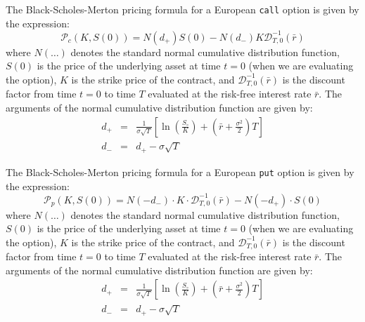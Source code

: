\documentclass[11pt]{article}
\theoremstyle{definition}
\begin{document}
\begin{definition}\label{defn:BSM-call-closed-form}
The Black-Scholes-Merton pricing formula for a European \texttt{call} option is given by the expression:
\begin{equation}
	\mathcal{P}_{c}(K,S(0)) = N(d_{+})S(0) - N(d_{-})K\mathcal{D}^{-1}_{T,0}(\bar{r})
\end{equation}
where $N(\dots)$ denotes the standard normal cumulative distribution function, $S(0)$ is the price of the underlying asset at time $t=0$ (when we are evaluating the option),
$K$ is the strike price of the contract, and $\mathcal{D}^{-1}_{T,0}(\bar{r})$ is the discount factor from time $t=0$ to time $T$ evaluated at the risk-free interest rate $\bar{r}$.
The arguments of the normal cumulative distribution function are given by:
\begin{eqnarray}
d_{+} & = & \frac{1}{\sigma\sqrt{T}}\left[\ln(\frac{S_{\circ}}{K}) + (\bar{r}+\frac{\sigma^{2}}{2})T\right] \\
d_{-} & = & d_{+} - \sigma\sqrt{T}
\end{eqnarray}
\end{definition}

\begin{definition}\label{defn:BSM-put-closed-form}
The Black-Scholes-Merton pricing formula for a European \texttt{put} option is given by the expression:
\begin{equation*}
\mathcal{P}_{p}(K,S(0)) = N(-d_{-})\cdot{K}\cdot\mathcal{D}^{-1}_{T,0}(\bar{r}) - N(-d_{+})\cdot{S}(0)
\end{equation*}
where $N(\dots)$ denotes the standard normal cumulative distribution function, 
$S(0)$ is the price of the underlying asset at time $t=0$ (when we are evaluating the option),
$K$ is the strike price of the contract, and $\mathcal{D}^{-1}_{T,0}(\bar{r})$ is the discount factor from time $t=0$ to time $T$ evaluated at the risk-free interest rate $\bar{r}$.
The arguments of the normal cumulative distribution function are given by:
\begin{eqnarray}
d_{+} & = & \frac{1}{\sigma\sqrt{T}}\left[\ln(\frac{S_{\circ}}{K}) + (\bar{r}+\frac{\sigma^{2}}{2})T\right] \\
d_{-} & = & d_{+} - \sigma\sqrt{T}
\end{eqnarray}
\end{definition}
\end{document}

